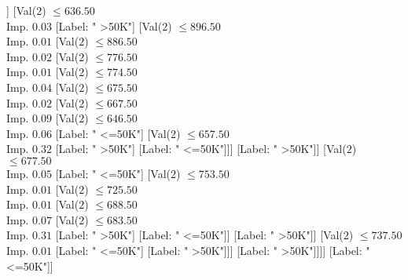 \documentclass[margin=10pt]{standalone}
\begin{document}
\begin{forest}
																								[Val($2$) $ \leq 614.50$ \\ Imp. $0.01$
																									[Val($2$) $ \leq 599.50$ \\ Imp. $0.19$
																										[Label: " >50K"]
																										[Label: " <=50K"]]
																									[Val($2$) $ \leq 636.50$ \\ Imp. $0.03$
																										[Label: " >50K"]
																										[Val($2$) $ \leq 896.50$ \\ Imp. $0.01$
																											[Val($2$) $ \leq 886.50$ \\ Imp. $0.02$
																												[Val($2$) $ \leq 776.50$ \\ Imp. $0.01$
																													[Val($2$) $ \leq 774.50$ \\ Imp. $0.04$
																														[Val($2$) $ \leq 675.50$ \\ Imp. $0.02$
																															[Val($2$) $ \leq 667.50$ \\ Imp. $0.09$
																																[Val($2$) $ \leq 646.50$ \\ Imp. $0.06$
																																	[Label: " <=50K"]
																																	[Val($2$) $ \leq 657.50$ \\ Imp. $0.32$
																																		[Label: " >50K"]
																																		[Label: " <=50K"]]]
																																[Label: " >50K"]]
																															[Val($2$) $ \leq 677.50$ \\ Imp. $0.05$
																																[Label: " <=50K"]
																																[Val($2$) $ \leq 753.50$ \\ Imp. $0.01$
																																	[Val($2$) $ \leq 725.50$ \\ Imp. $0.01$
																																		[Val($2$) $ \leq 688.50$ \\ Imp. $0.07$
																																			[Val($2$) $ \leq 683.50$ \\ Imp. $0.31$
																																				[Label: " >50K"]
																																				[Label: " <=50K"]]
																																			[Label: " >50K"]]
																																		[Val($2$) $ \leq 737.50$ \\ Imp. $0.01$
																																			[Label: " <=50K"]
																																			[Label: " >50K"]]]
																																	[Label: " >50K"]]]]
																														[Label: " <=50K"]]

\end{forest}
\end{document}
